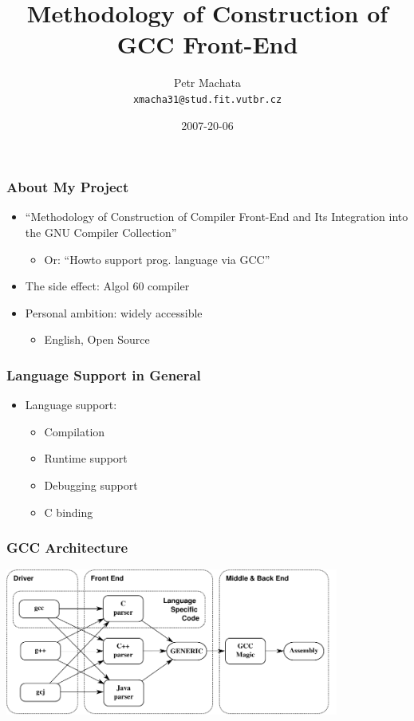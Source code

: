 \documentclass[14pt]{beamer}
\title{Methodology of Construction of GCC Front-End}
\author[Petr Machata]{Petr Machata \\ \texttt{xmacha31@stud.fit.vutbr.cz}}
\date{2007-20-06}
\begin{document}
\frame{\titlepage}

\frame
{
  \frametitle{About My Project}

  \begin{itemize}
  \item ``Methodology of Construction of Compiler Front-End and Its
    Integration into the GNU Compiler Collection''
    \begin{itemize}
    \item Or: ``Howto support prog. language via GCC''
    \end{itemize}
  \end{itemize}

  \begin{itemize}
  \item The side effect: Algol 60 compiler
  \item Personal ambition: widely accessible
    \begin{itemize}
    \item English, Open Source
    \end{itemize}
  \end{itemize}
}

\frame
{
  \frametitle{Language Support in General}

  \begin{itemize}
  \item Language support:
    \begin{itemize}
    \item Compilation
    \item Runtime support
    \item Debugging support
    \item C binding
    \end{itemize}
  \end{itemize}
}

\frame
{
  \frametitle{GCC Architecture}

  \includegraphics[height=4.8cm]{demo-gccarch.pdf}
}
\end{document}
